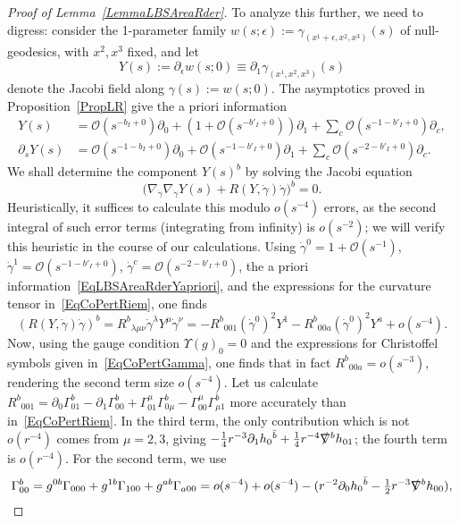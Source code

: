 \documentclass[reqno,11pt,letterpaper]{amsart}
\numberwithin{equation}{section}
\numberwithin{figure}{section}
\theoremstyle{definition}
\theoremstyle{remark}
\newcommand{\mc}{\mathcal}
\newcommand{\cO}{\mc O}
\newcommand{\slnabla}{\slashed{\nabla}{}}
\newcommand{\Ups}{\Upsilon}
\newcommand{\eps}{\epsilon}
\newcommand{\pa}{\partial}
\newcommand{\half}{\tfrac{1}{2}}
\newcommand{\usref}[1]{{\upshape\ref{#1}}}
\begin{document}
\begin{proof}[Proof of Lemma~\usref{LemmaLBSAreaRder}]
  To analyze this further, we need to digress: consider the 1-parameter family $w(s;\eps):=\gamma_{(x^1+\eps,x^2,x^3)}(s)$ of null-geodesics, with $x^2,x^3$ fixed, and let
  \[
    Y(s):=\pa_\eps w(s;0)\equiv\pa_1\gamma_{(x^1,x^2,x^3)}(s)
  \]
  denote the Jacobi field along $\gamma(s):=w(s;0)$. The asymptotics proved in Proposition~\ref{PropLR} give the a priori information
  \begin{equation}
  \label{EqLBSAreaRderYapriori}
  \begin{split}
    Y(s) &= \cO(s^{-b_I+0})\pa_0 + (1+\cO(s^{-b'_I+0}))\pa_1 + \sum_c \cO(s^{-1-b'_I+0})\pa_c, \\
    \pa_s Y(s) &= \cO(s^{-1-b_I+0})\pa_0 + \cO(s^{-1-b'_I+0})\pa_1 + \sum_c \cO(s^{-2-b'_I+0})\pa_c.
  \end{split}
  \end{equation}
  We shall determine the component $Y(s)^b$ by solving the Jacobi equation
  \begin{equation}
  \label{EqLBSAreaRderJacobi}
    \bigl(\nabla_{\dot\gamma}\nabla_{\dot\gamma}Y(s) + R(Y,\dot\gamma)\dot\gamma\bigr)^b = 0.
  \end{equation}
  Heuristically, it suffices to calculate this modulo $o(s^{-4})$ errors, as the second integral of such error terms (integrating from infinity) is $o(s^{-2})$; we will verify this heuristic in the course of our calculations. Using $\dot\gamma^0=1+\cO(s^{-1})$, $\dot\gamma^1=\cO(s^{-1-b'_I+0})$, $\dot\gamma^c=\cO(s^{-2-b'_I+0})$, the a priori information~\eqref{EqLBSAreaRderYapriori}, and the expressions for the curvature tensor in~\eqref{EqCoPertRiem}, one finds
  \[
    (R(Y,\dot\gamma)\dot\gamma)^b = R^b{}_{\lambda\mu\nu}\dot\gamma^\lambda Y^\mu\dot\gamma^\nu = -R^b{}_{0 0 1}(\dot\gamma^0)^2 Y^1 - R^b{}_{0 0 a}(\dot\gamma^0)^2 Y^a + o(s^{-4}).
  \]
  Now, using the gauge condition $\Ups(g)_0=0$ and the expressions for Christoffel symbols given in~\eqref{EqCoPertGamma}, one finds that in fact $R^b{}_{0 0 a}=o(s^{-3})$, rendering the second term size $o(s^{-4})$. Let us calculate $R^b{}_{0 0 1}=\pa_0\Gamma^b_{0 1}-\pa_1\Gamma_{0 0}^b+\Gamma_{0 1}^\mu\Gamma_{0 \mu}^b-\Gamma_{0 0}^\mu\Gamma_{\mu 1}^b$ more accurately than in~\eqref{EqCoPertRiem}. In the third term, the only contribution which is not $o(r^{-4})$ comes from $\mu=2,3$, giving $-\tfrac14 r^{-3}\pa_1 h_0{}^{\bar b}+\tfrac14 r^{-4}\slnabla^b h_{0 1}$; the fourth term is $o(r^{-4})$. For the second term, we use
  \[
    \Gamma^b_{0 0} = g^{0 b}\Gamma_{0 0 0}+g^{1 b}\Gamma_{1 0 0}+g^{a b}\Gamma_{a 0 0} = o(s^{-4}) + o(s^{-4}) - (r^{-2}\pa_0 h_0{}^{\bar b}-\half r^{-3}\slnabla^b h_{0 0}),
\]
\end{proof}
\end{document}
